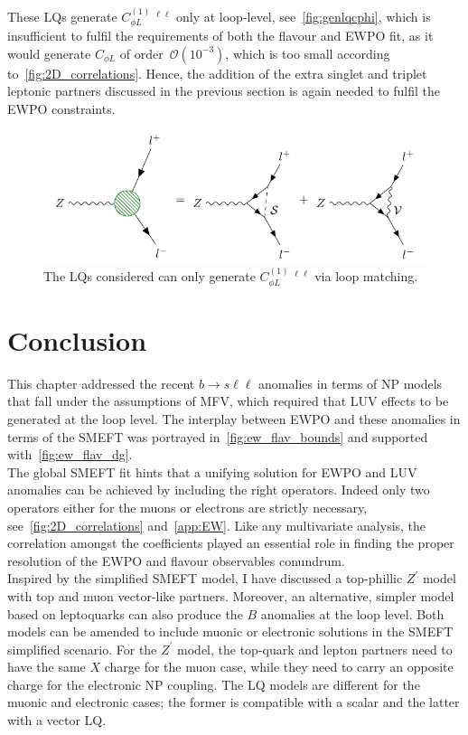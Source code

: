 These LQs generate $C_{\phi L}^{(1)}\ ^{\ell\ell}$ only at loop-level, see~\autoref{fig:genlqcphi}, which is insufficient to fulfil the requirements of both the flavour and EWPO fit, as it would generate $C_{\phi L}$ of order~$ \mathcal{O}(10^{-3})$, which is too small according to~\autoref{fig:2D_correlations}. Hence, the addition of the extra singlet and triplet leptonic partners discussed in the previous section is again needed to fulfil the EWPO constraints.
\begin{figure}[htpb!]
	\centering 
	\includegraphics[width=\linewidth]{figures/LQ_tri}
	\caption{The LQs considered can only generate  $C_{\phi L}^{(1)}\ ^{\ell\ell}$ via loop matching. }    
	\label{fig:genlqcphi}
\end{figure}
\section{Conclusion}
\label{sec:sum}
This chapter addressed the recent $b \to s \ell \ell $ anomalies in terms of NP models that fall under the assumptions of MFV, which required that LUV effects to be generated at the loop level.  The interplay between EWPO and these anomalies in terms of the SMEFT was portrayed in~\autoref{fig:ew_flav_bounds} and supported with~\autoref{fig:ew_flav_dg}. \\
The global SMEFT fit hints that a unifying solution for EWPO and LUV anomalies can be achieved by including the right operators. Indeed only two operators either for the muons or electrons are strictly necessary, see~\autoref{fig:2D_correlations} and~\autoref{app:EW}. Like any multivariate analysis, the correlation amongst the coefficients played an essential role in finding the proper resolution of the EWPO and flavour observables conundrum. \\ 
Inspired by the simplified SMEFT model, I have discussed a top-phillic $Z^\prime$ model with top and muon vector-like partners. Moreover, an alternative, simpler model based on leptoquarks can also produce the $B$ anomalies at the loop level. Both models can be amended to include muonic or electronic solutions in the SMEFT simplified scenario. For the $Z^\prime$ model, the top-quark and lepton partners need to have the same $X$ charge for the muon case, while they need to carry an opposite charge for the electronic NP coupling.  The LQ models are different for the muonic and electronic cases; the former is compatible with a scalar and the latter with a vector LQ. \\ 

